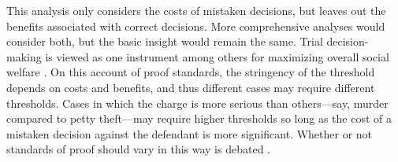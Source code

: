 \documentclass{article}
\begin{document}
This analysis only considers the costs of mistaken decisions, but leaves out the benefits associated with correct decisions. More comprehensive analyses would consider both, but the basic insight would remain the same. Trial decision-making is viewed as one instrument among others  for maximizing overall social welfare \citep{Posner1973}. 
On this account of proof standards, the stringency of the threshold depends on costs and benefits, and thus different cases may require different thresholds. Cases in which the charge is more serious than others---say, murder compared to petty theft---may require higher thresholds so long as the cost of a mistaken decision against the defendant is more significant. %
Whether or not standards of proof should vary in this way is debated \citep{kaplow2012, picinali2013}.












\end{document}
